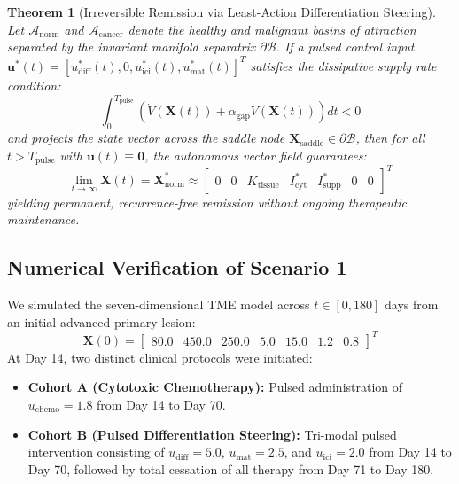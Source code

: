 \documentclass[11pt,a4paper]{article}
\newtheorem{theorem}{Theorem}
\begin{document}
\begin{theorem}[Irreversible Remission via Least-Action Differentiation Steering]
Let $\mathcal{A}_{\mathrm{norm}}$ and $\mathcal{A}_{\mathrm{cancer}}$ denote the healthy and malignant basins of attraction separated by the invariant manifold separatrix $\partial \mathcal{B}$. If a pulsed control input $\bm{u}^*(t) = [u_{\mathrm{diff}}^*(t), 0, u_{\mathrm{ici}}^*(t), u_{\mathrm{mat}}^*(t)]^T$ satisfies the dissipative supply rate condition:
\begin{equation}
\int_0^{T_{\mathrm{pulse}}} \left( \dot{V}(\bm{X}(t)) + \alpha_{\mathrm{gap}} V(\bm{X}(t)) \right) dt < 0
\end{equation}
and projects the state vector across the saddle node $\bm{X}_{\mathrm{saddle}} \in \partial \mathcal{B}$, then for all $t > T_{\mathrm{pulse}}$ with $\bm{u}(t) \equiv \bm{0}$, the autonomous vector field guarantees:
\begin{equation}
\lim_{t \to \infty} \bm{X}(t) = \bm{X}^*_{\mathrm{norm}} \approx \begin{bmatrix} 0 & 0 & K_{\mathrm{tissue}} & I_{\mathrm{cyt}}^* & I_{\mathrm{supp}}^* & 0 & 0 \end{bmatrix}^T
\end{equation}
yielding permanent, recurrence-free remission without ongoing therapeutic maintenance.
\end{theorem}

\subsection{Numerical Verification of Scenario 1}

We simulated the seven-dimensional TME model across $t \in [0, 180]$ days from an initial advanced primary lesion:
\begin{equation}
\bm{X}(0) = \begin{bmatrix} 80.0 & 450.0 & 250.0 & 5.0 & 15.0 & 1.2 & 0.8 \end{bmatrix}^T
\end{equation}
At Day 14, two distinct clinical protocols were initiated:
\begin{itemize}
    \item \textbf{Cohort A (Cytotoxic Chemotherapy):} Pulsed administration of $u_{\mathrm{chemo}} = 1.8$ from Day 14 to Day 70.
    \item \textbf{Cohort B (Pulsed Differentiation Steering):} Tri-modal pulsed intervention consisting of $u_{\mathrm{diff}} = 5.0$, $u_{\mathrm{mat}} = 2.5$, and $u_{\mathrm{ici}} = 2.0$ from Day 14 to Day 70, followed by total cessation of all therapy from Day 71 to Day 180.
\end{itemize}
\end{document}
